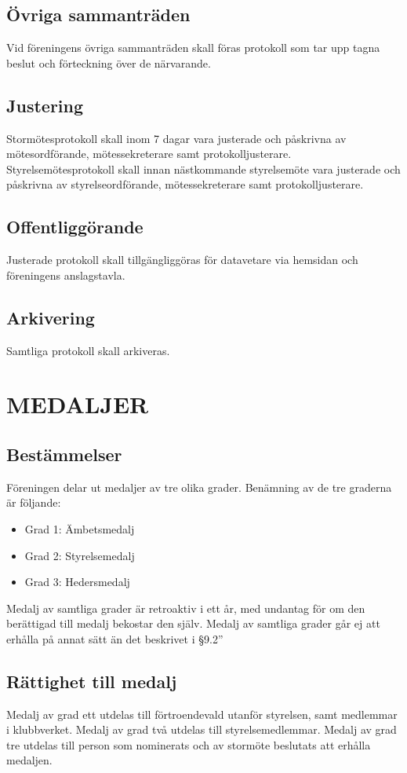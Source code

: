\documentclass[a4paper]{article}
\begin{document}
{{  \subsection{Övriga sammanträden}
  Vid föreningens övriga sammanträden skall föras protokoll som tar upp tagna beslut och förteckning över de närvarande.
  \subsection{Justering}
  Stormötesprotokoll skall inom 7 dagar vara justerade och påskrivna av mötesordförande, mötessekreterare samt protokolljusterare.\\
  Styrelsemötesprotokoll skall innan nästkommande styrelsemöte vara justerade och påskrivna av styrelseordförande, mötessekreterare samt protokolljusterare.
  \subsection{Offentliggörande}
  Justerade protokoll skall tillgängliggöras för datavetare via hemsidan och föreningens anslagstavla.
  \subsection{Arkivering}
  Samtliga protokoll skall arkiveras.}
\section{MEDALJER}
\subsection{Bestämmelser}
Föreningen delar ut medaljer av tre olika grader. Benämning av de tre graderna är
följande:
\begin{itemize}
\item Grad 1: Ämbetsmedalj
\item Grad 2: Styrelsemedalj
\item Grad 3: Hedersmedalj
\end{itemize}
Medalj av samtliga grader är retroaktiv i ett år, med undantag för om den berättigad till medalj bekostar den själv. Medalj av samtliga grader går ej att erhålla på annat sätt än det beskrivet i §9.2”
\subsection{Rättighet till medalj}
Medalj av grad ett utdelas till förtroendevald utanför styrelsen, samt medlemmar i klubbverket. Medalj av grad två utdelas till styrelsemedlemmar. Medalj av grad tre utdelas till person som nominerats och av stormöte beslutats att erhålla medaljen.
}
\end{document}

